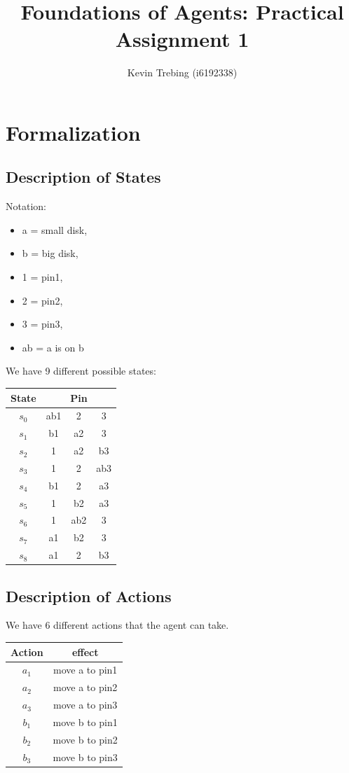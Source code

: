 \documentclass[a4paper]{article}
\title{Foundations of Agents: Practical Assignment 1}
\author{Kevin Trebing (i6192338)}
\begin{document}
\maketitle

\section{Formalization}
\subsection{Description of States}
Notation:
\begin{multicols}{2}
\begin{itemize}

\item a = small disk,
\item b = big disk,
\item 1 = pin1,
\item 2 = pin2,
\item 3 = pin3,
\item ab = a is on b
\end{itemize}
\end{multicols}

\noindent
We have 9 different possible states: \\

\begin{tabular}{ c|c|c|c}
	State & \multicolumn{3}{c}{Pin} \\
	\hline
	$s_{0}$ & ab1 & 2 & 3 \\
	$s_{1}$ & b1 & a2 & 3 \\
	$s_{2}$ & 1 & a2 & b3 \\
	$s_{3}$ & 1 & 2 & ab3 \\
	$s_{4}$ & b1 & 2 & a3 \\
	$s_{5}$ & 1 & b2 & a3 \\
	$s_{6}$ & 1 & ab2 & 3 \\
	$s_{7}$ & a1 & b2 & 3 \\
	$s_{8}$ & a1 & 2 & b3 
\end{tabular}

\subsection{Description of Actions}
We have 6 different actions that the agent can take. \\

\begin{tabular}{c|c}
Action & effect \\
\hline
$a_{1}$ & move a to pin1 \\
$a_{2}$ & move a to pin2 \\
$a_{3}$ & move a to pin3 \\
$b_{1}$ & move b to pin1 \\
$b_{2}$ & move b to pin2 \\
$b_{3}$ & move b to pin3
\end{tabular}
\end{document}
